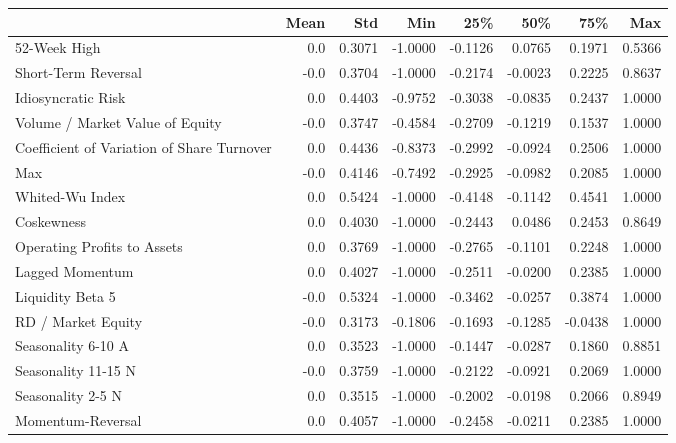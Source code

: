 \begin{tabular}{lrrrrrrr}
\toprule
{} &  Mean &     Std &     Min &     25\% &     50\% &     75\% &     Max \\
\midrule
52-Week High                               &   0.0 &  0.3071 & -1.0000 & -0.1126 &  0.0765 &  0.1971 &  0.5366 \\
Short-Term Reversal                        &  -0.0 &  0.3704 & -1.0000 & -0.2174 & -0.0023 &  0.2225 &  0.8637 \\
Idiosyncratic Risk                         &   0.0 &  0.4403 & -0.9752 & -0.3038 & -0.0835 &  0.2437 &  1.0000 \\
Volume / Market Value of Equity            &  -0.0 &  0.3747 & -0.4584 & -0.2709 & -0.1219 &  0.1537 &  1.0000 \\
Coefficient of Variation of Share Turnover &   0.0 &  0.4436 & -0.8373 & -0.2992 & -0.0924 &  0.2506 &  1.0000 \\
Max                                        &  -0.0 &  0.4146 & -0.7492 & -0.2925 & -0.0982 &  0.2085 &  1.0000 \\
Whited-Wu Index                            &   0.0 &  0.5424 & -1.0000 & -0.4148 & -0.1142 &  0.4541 &  1.0000 \\
Coskewness                                 &   0.0 &  0.4030 & -1.0000 & -0.2443 &  0.0486 &  0.2453 &  0.8649 \\
Operating Profits to Assets                &   0.0 &  0.3769 & -1.0000 & -0.2765 & -0.1101 &  0.2248 &  1.0000 \\
Lagged Momentum                            &   0.0 &  0.4027 & -1.0000 & -0.2511 & -0.0200 &  0.2385 &  1.0000 \\
Liquidity Beta 5                           &  -0.0 &  0.5324 & -1.0000 & -0.3462 & -0.0257 &  0.3874 &  1.0000 \\
RD / Market Equity                         &  -0.0 &  0.3173 & -0.1806 & -0.1693 & -0.1285 & -0.0438 &  1.0000 \\
Seasonality 6-10 A                         &   0.0 &  0.3523 & -1.0000 & -0.1447 & -0.0287 &  0.1860 &  0.8851 \\
Seasonality 11-15 N                        &  -0.0 &  0.3759 & -1.0000 & -0.2122 & -0.0921 &  0.2069 &  1.0000 \\
Seasonality 2-5 N                          &   0.0 &  0.3515 & -1.0000 & -0.2002 & -0.0198 &  0.2066 &  0.8949 \\
Momentum-Reversal                          &   0.0 &  0.4057 & -1.0000 & -0.2458 & -0.0211 &  0.2385 &  1.0000 \\

\end{tabular}
